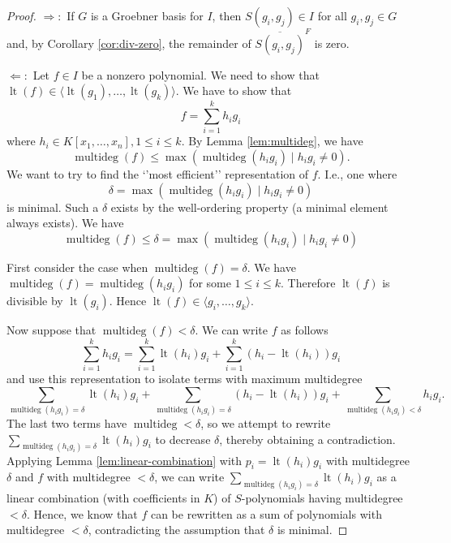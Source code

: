 \documentclass[
]{book}
\theoremstyle{definition}
\theoremstyle{definition}
\theoremstyle{definition}
\theoremstyle{definition}
\theoremstyle{remark}
\begin{document}
\begin{proof}
\(\Rightarrow:\)
If \(G\) is a Groebner basis for \(I\), then \(S(g_i,g_j) \in I\) for all \(g_i,g_j \in G\) and, by Corollary \ref{cor:div-zero}, the remainder of \(\overline{S(g_i,g_j)}^F\) is zero.

\(\Leftarrow:\)
Let \(f \in I\) be a nonzero polynomial. We need to show that \(\operatorname{lt}(f) \in \langle \operatorname{lt}(g_1), \ldots, \operatorname{lt}(g_k) \rangle\). We have to show that
\[
f = \sum^k_{i=1} h_ig_i
\]
where \(h_i \in K[x_1,\ldots,x_n], 1 \le i \le k\). By Lemma \ref{lem:multideg}, we have
\[
\operatorname{multideg}(f) \le \max(\operatorname{multideg}(h_ig_i) \mid h_ig_i \ne 0).
\]
We want to try to find the `'most efficient'' representation of \(f\). I.e., one where
\[
\delta = \max(\operatorname{multideg}(h_ig_i) \mid h_ig_i \ne 0)
\]
is minimal. Such a \(\delta\) exists by the well-ordering property (a minimal element always exists). We have
\[
\operatorname{multideg}(f) \le \delta = \max(\operatorname{multideg}(h_ig_i) \mid h_ig_i \ne 0)
\]

First consider the case when \(\operatorname{multideg}(f) = \delta\). We have \(\operatorname{multideg}(f) = \operatorname{multideg}(h_ig_i)\) for some \(1 \le i \le k\). Therefore \(\operatorname{lt}(f)\) is divisible by \(\operatorname{lt}(g_i)\). Hence \(\operatorname{lt}(f) \in \langle g_i, \ldots, g_k \rangle\).

Now suppose that \(\operatorname{multideg}(f) < \delta\). We can write \(f\) as follows
\[
\sum_{i=1}^{k}h_{i}g_{i}=\sum_{i=1}^{k}\operatorname{lt}(h_{i})g_{i}+\sum_{i=1}^{k}(h_{i}-\operatorname{lt}(h_{i}))g_{i}
\]
and use this representation to isolate terms with maximum multidegree
\[
\sum_{\operatorname{multideg}(h_{i}g_{i})=\delta}\operatorname{lt}(h_{i})g_{i}+\sum_{\operatorname{multideg}(h_{i}g_{i})=\delta}(h_{i}-\operatorname{lt}(h_{i}))g_{i}+\sum_{\operatorname{multideg}(h_{i}g_{i})<\delta}h_{i}g_{i}.
\]
The last two terms have \(\operatorname{multideg}< \delta\), so we attempt to rewrite \(\sum_{\operatorname{multideg}(h_ig_i)= \delta} \operatorname{lt}(h_i)g_i\) to decrease \(\delta\), thereby obtaining a contradiction. Applying Lemma \ref{lem:linear-combination} with \(p_i = \operatorname{lt}(h_i)g_i\) with multidegree \(\delta\) and \(f\) with multidegree \(< \delta\), we can write \(\sum_{\operatorname{multideg}(h_ig_i) = \delta} \operatorname{lt}(h_i)g_i\) as a linear combination (with coefficients in \(K\)) of \(S\)-polynomials having multidegree \(< \delta\). Hence, we know that \(f\) can be rewritten as a sum of polynomials with multidegree \(< \delta\), contradicting the assumption that \(\delta\) is minimal.


\end{proof}
\end{document}
